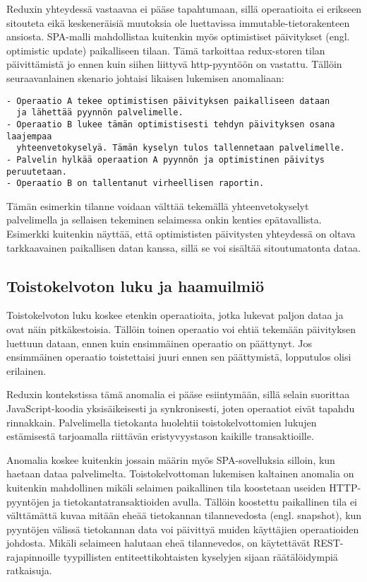 \documentclass[finnish,twoside,censored,csm,sw-track-2018]{HYthesisML}
\begin{document}
Reduxin yhteydessä vastaavaa ei pääse tapahtumaan, sillä operaatioita ei erikseen sitouteta eikä keskeneräisiä muutoksia ole luettavissa immutable-tietorakenteen ansiosta. SPA-malli mahdollistaa kuitenkin myös optimistiset päivitykset (engl. optimistic update) paikalliseen tilaan. Tämä tarkoittaa redux-storen tilan päivittämistä jo ennen kuin siihen liittyvä http-pyyntöön on vastattu. Tällöin seuraavanlainen skenario johtaisi likaisen lukemisen anomaliaan:

\begin{Verbatim}[fontsize=\small]
- Operaatio A tekee optimistisen päivityksen paikalliseen dataan 
  ja lähettää pyynnön palvelimelle.
- Operaatio B lukee tämän optimistisesti tehdyn päivityksen osana laajempaa
  yhteenvetokyselyä. Tämän kyselyn tulos tallennetaan palvelimelle. 
- Palvelin hylkää operaation A pyynnön ja optimistinen päivitys peruutetaan.
- Operaatio B on tallentanut virheellisen raportin.
\end{Verbatim}

Tämän esimerkin tilanne voidaan välttää tekemällä yhteenvetokyselyt palvelimella ja sellaisen tekeminen selaimessa onkin kenties epätavallista. Esimerkki kuitenkin näyttää, että optimististen päivitysten yhteydessä on oltava tarkkaavainen paikallisen datan kanssa, sillä se voi sisältää sitoutumatonta dataa.

\subsection{Toistokelvoton luku ja haamuilmiö}

Toistokelvoton luku koskee etenkin operaatioita, jotka lukevat paljon dataa ja ovat näin pitkäkestoisia. Tällöin toinen operaatio voi ehtiä tekemään päivityksen luettuun dataan, ennen kuin ensimmäinen operaatio on päättynyt. Jos ensimmäinen operaatio toistettaisi juuri ennen sen päättymistä, lopputulos olisi erilainen.

Reduxin kontekstissa tämä anomalia ei pääse esiintymään, sillä selain suorittaa JavaScript-koodia yksisäikeisesti ja synkronisesti, joten operaatiot eivät tapahdu rinnakkain. Palvelimella tietokanta huolehtii toistokelvottomien lukujen estämisestä tarjoamalla riittävän eristyvyystason kaikille transaktioille. 

Anomalia koskee kuitenkin jossain määrin myös SPA-sovelluksia silloin, kun haetaan dataa palvelimelta.  Toistokelvottoman lukemisen kaltainen anomalia on kuitenkin mahdollinen mikäli selaimen paikallinen tila koostetaan useiden HTTP-pyyntöjen ja tietokantatransaktioiden avulla. Tällöin koostettu paikallinen tila ei välttämättä kuvaa mitään eheää tietokannan tilannevedosta (engl. snapshot), kun pyyntöjen välissä tietokannan data voi päivittyä muiden käyttäjien operaatioiden johdosta. Mikäli selaimeen halutaan eheä tilannevedos, on käytettävät REST-rajapinnoille tyypillisten entiteettikohtaisten kyselyjen sijaan räätälöidympiä ratkaisuja.
\end{document}
